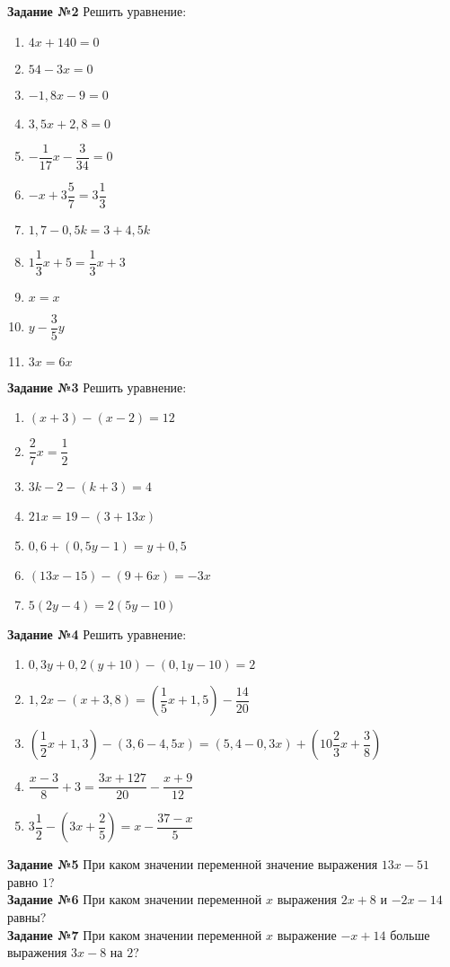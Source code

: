 \documentclass[12pt, a4paper]{article}
\begin{document}
		\textbf{Задание №2} Решить уравнение:
		\begin{multicols}{3}
			\begin{enumerate}[label=\asbuk*)]
				\item $4x+140=0$
				\item $54-3x=0$
				\item $-1,8x-9=0$
				\item $3,5x+2,8=0$
				\item $-\dfrac{1}{17}x-\dfrac{3}{34}=0$
				\item $-x+3\dfrac{5}{7}=3\dfrac{1}{3}$
				\item $1,7-0,5k=3+4,5k$
				\item $1\dfrac{1}{3}x+5=\dfrac{1}{3}x+3$
				\item $x=x$
				\item $y-\dfrac{3}{5}y$
				\item $3x=6x$
			\end{enumerate}
		\end{multicols}
	
		\textbf{Задание №3} Решить уравнение:
		\begin{multicols}{3}
			\begin{enumerate}[label=\asbuk*)]
				\item $(x+3)-(x-2)=12$
				\item $\dfrac{2}{7}x=\dfrac{1}{2}$
				\item $3k-2-(k+3)=4$
				\item $21x=19-(3+13x)$
				\item $0,6+(0,5y-1)=y+0,5$
				\item $(13x-15)-(9+6x)=-3x$
				\item $5(2y-4)=2(5y-10)$
			\end{enumerate}
		\end{multicols}
	
	\textbf{Задание №4} Решить уравнение:
	\begin{enumerate}[label=\asbuk*)]
		\item $0,3y+0,2(y+10)-(0,1y-10)=2$
		\item $1,2x-(x+3,8)=(\dfrac{1}{5}x+1,5)-\dfrac{14}{20}$
		\item $(\dfrac{1}{2}x+1,3)-(3,6-4,5x)=(5,4-0,3x)+(10\dfrac{2}{3}x+\dfrac{3}{8})$
		\item $\dfrac{x-3}{8}+3=\dfrac{3x+127}{20}-\dfrac{x+9}{12}$
		\item $3\dfrac{1}{2}-\left(3x+\dfrac{2}{5}\right)=x-\dfrac{37-x}{5}$
	\end{enumerate}

	\textbf{Задание №5} При каком значении переменной значение выражения $13x-51$ равно $1$?\\
	
	\textbf{Задание №6} При каком значении переменной $x$ выражения $2x+8$ и $-2x-14$ равны?\\
	
	\textbf{Задание №7} При каком значении переменной $x$ выражение $-x+14$ больше выражения $3x-8$ на $2$?
	
\end{document}
